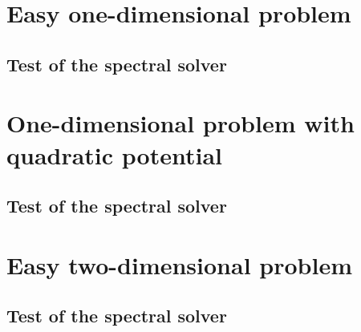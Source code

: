 \documentclass{report}
\begin{document}
    
    \section*{Easy one-dimensional problem}
    
        
        \subsection*{Test of the spectral solver}
            
            \begin{figure}[H]
                \centering
                {\graphicspath{{../problem_1D_easy/error_spectral/}}}
            \end{figure}
            
        
    \newpage
    
    \section*{One-dimensional problem with quadratic potential}
    
        
        \subsection*{Test of the spectral solver}
            
            \begin{figure}[H]
                \centering
                {\graphicspath{{../problem_1D_quadratic/error_spectral/}}}
            \end{figure}
            
        
    \newpage
    
    \section*{Easy two-dimensional problem}
    
        
        \subsection*{Test of the spectral solver}
            
            \begin{figure}[H]
                \centering
                {\graphicspath{{../problem_2D_easy/error_spectral/}}}
            \end{figure}
            
\end{document}
